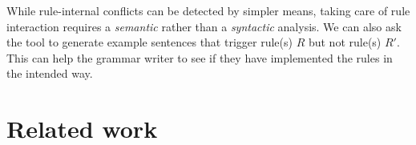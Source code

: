 While rule-internal conflicts can be detected by simpler means, taking
care of rule interaction requires a {\em semantic} rather than a {\em syntactic} analysis.
We can also ask the tool to
generate example sentences that trigger rule(s) $R$ but not rule(s) $R'$. 
This can help the grammar writer to see
if they have implemented the rules in the intended way.










\section{Related work}
\label{sec:prev}


